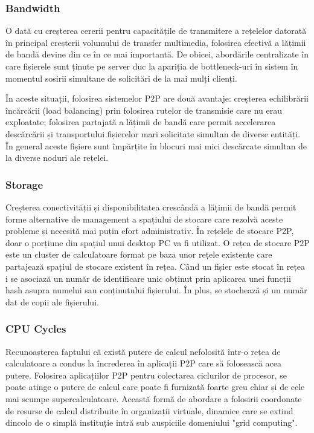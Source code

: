 \subsubsection{Bandwidth}

O dată cu creșterea cererii pentru capacitățile de transmitere a rețelelor
datorată în principal creșterii volumului de transfer multimedia, folosirea
efectivă a lățimii de bandă devine din ce în ce mai importantă. De obicei,
abordările centralizate în care fișierele sunt ținute pe server duc la
apariția de bottleneck-uri în sistem în momentul sosirii simultane de
solicitări de la mai mulți clienți.

În aceste situații, folosirea sistemelor P2P are două avantaje: creșterea
echilibrării încărcării (load balancing) prin folosirea rutelor de transmisie
care nu erau exploatate; folosirea partajată a lățimii de bandă care permit
accelerarea descărcării și transportului fișierelor mari solicitate simultan
de diverse entități. În general aceste fișiere sunt împărțite în blocuri mai
mici descărcate simultan de la diverse noduri ale rețelei.

\subsubsection{Storage}

Creșterea conectivității și disponibilitatea crescândă a lățimii de bandă
permit forme alternative de management a spațiului de stocare care rezolvă
aceste probleme și necesită mai puțin efort administrativ. În rețelele de
stocare P2P, doar o porțiune din spațiul unui desktop PC va fi utilizat. O
rețea de stocare P2P este un cluster de calculatoare format pe baza unor
rețele existente care partajează spațiul de stocare existent în rețea. Când un
fișier este stocat în rețea i se asociază un număr de identificare unic
obținut prin aplicarea unei funcții hash asupra numelui sau conținutului
fișierului. În plus, se stochează și un număr dat de copii ale fișierului.

\subsubsection{CPU Cycles}

Recunoașterea faptului că există putere de calcul nefolosită într-o rețea de
calculatoare a condus la încrederea în aplicații P2P care să folosească acea
putere. Folosirea aplicațiilor P2P pentru colectarea ciclurilor de procesor,
se poate atinge o putere de calcul care poate fi furnizată foarte greu chiar
și de cele mai scumpe supercalculatoare. Această formă de abordare a folosirii
coordonate de resurse de calcul distribuite în organizații virtuale, dinamice
care se extind dincolo de o simplă instituție intră sub auspiciile domeniului
"grid computing".

